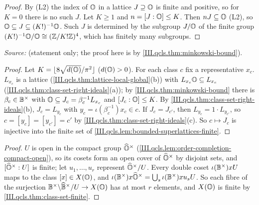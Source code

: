 \begin{lemma}
\end{lemma}
\begin{proof}
By (L2) the index of $\mathbb{O}$ in a lattice $J\supseteq\mathbb{O}$ is finite and positive, so for $K=0$ there is no such $J$. Let $K\ge1$ and $n=[J:\mathbb{O}]\le K$.
Then $nJ\subseteq\mathbb{O}$ (L2), so $\mathbb{O}\subseteq J\subseteq(K!)^{-1}\mathbb{O}$. Such $J$ is determined by the subgroup $J/\mathbb{O}$ of the finite group
$(K!)^{-1}\mathbb{O}/\mathbb{O}\cong(\mathbb{Z}/K!\mathbb{Z})^4$, which has finitely many subgroups.
\end{proof}

\begin{theorem}
\end{theorem}
\noindent \emph{Source:} \cite[Thm.~1.10, p.~345]{Piz} (statement only; the proof here is by \cref{III.qcls.thm:minkowski-bound}).
\begin{proof}
Let $K=\lfloor8\sqrt{d(\mathbb{O})}/\pi^2\rfloor$ ($d(\mathbb{O})>0$). For each class $c$ fix a representative $x_c$. $L_{x_c}$ is a lattice
(\cref{III.qcls.thm:lattice-local-global}(b)) with $L_{x_c}\mathbb{O}\subseteq L_{x_c}$ (\cref{III.qcls.thm:class-set-right-ideals}(a)); by
\cref{III.qcls.thm:minkowski-bound} there is $\beta_c\in\mathbb{B}^\times$ with $\mathbb{O}\subseteq J_c=\beta_c^{-1}L_{x_c}$ and $[J_c:\mathbb{O}]\le K$. By
\cref{III.qcls.thm:class-set-right-ideals}(b), $J_c=L_{y_c}$ with $y_c=\iota(\beta_c^{-1})x_c\in c$. If $J_c=J_{c'}$, then $L_{y_c}=1\cdot L_{y_{c'}}$, so
$c=[y_c]=[y_{c'}]=c'$ by \cref{III.qcls.thm:class-set-right-ideals}(c). So $c\mapsto J_c$ is injective into the finite set of
\cref{III.qcls.lem:bounded-superlattices-finite}.
\end{proof}

\begin{corollary}
\end{corollary}
\begin{proof}
$U$ is open in the compact group $\widehat{\mathbb{O}}^\times$ (\cref{III.qcls.lem:order-completion-compact-open}), so its cosets form an open cover of $\widehat{\mathbb{O}}^\times$ by disjoint
sets, and $[\widehat{\mathbb{O}}^\times:U]$ is finite; let $u_1,\dots,u_r$ represent $\widehat{\mathbb{O}}^\times/U$. Every double coset $\iota(\mathbb{B}^\times)xU$ maps to the class
$[x]\in X(\mathbb{O})$, and $\iota(\mathbb{B}^\times)x\widehat{\mathbb{O}}^\times=\bigcup_s\iota(\mathbb{B}^\times)xu_sU$. So each fibre of the surjection
$\mathbb{B}^\times\backslash\widehat{\mathbb{B}}^\times/U\to X(\mathbb{O})$ has at most $r$ elements, and $X(\mathbb{O})$ is finite by \cref{III.qcls.thm:class-set-finite}.
\end{proof}

